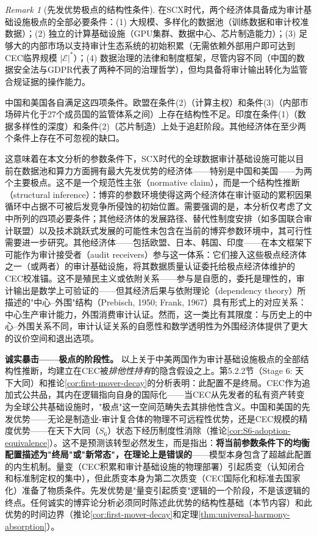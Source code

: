 \documentclass[12pt,a4paper]{ctexart}
\theoremstyle{definition}
\theoremstyle{remark}
\newtheorem{remark}{Remark}[section]
\begin{document}
\begin{remark}[先发优势极点的结构性条件]
在SCX时代，两个经济体具备成为审计基础设施极点的全部必要条件：(1) 大规模、多样化的数据池（训练数据和审计校准数据）；(2) 独立的计算基础设施（GPU集群、数据中心、芯片制造能力）；(3) 足够大的内部市场以支持审计生态系统的初始积累（无需依赖外部用户即可达到CEC临界规模 $|\mathcal{E}|^*$）；(4) 数据治理的法律和制度框架，尽管内容不同（中国的数据安全法与GDPR代表了两种不同的治理哲学），但均具备将审计输出转化为监管合规证据的操作能力。

中国和美国各自满足这四项条件。欧盟在条件(2)（计算主权）和条件(3)（内部市场碎片化于27个成员国的监管体系之间）上存在结构性不足。印度在条件(1)（数据多样性的深度）和条件(2)（芯片制造）上处于追赶阶段。其他经济体在至少两个条件上存在不可忽视的缺口。

这意味着在本文分析的参数条件下，SCX时代的全球数据审计基础设施可能以目前在数据池和算力方面拥有最大先发优势的经济体——特别是中国和美国——为两个主要极点。这不是一个规范性主张（normative claim），而是一个结构性推断（structural inference）：博弈的参数环境使得这两个经济体在审计驱动的累积因果循环中占据不可被后发竞争所侵蚀的初始位置。需要强调的是，本分析仅考虑了文中所列的四项必要条件；其他经济体的发展路径、替代性制度安排（如多国联合审计联盟）以及技术跳跃式发展的可能性未包含在当前的博弈参数环境中，其可行性需要进一步研究。其他经济体——包括欧盟、日本、韩国、印度——在本文框架下可能作为审计接受者（audit receivers）参与这一体系：它们接入这些极点经济体之一（或两者）的审计基础设施，将其数据质量认证委托给极点经济体维护的CEC校准锚。这不是殖民主义或依附关系——参与是自愿的，委托是理性的，审计输出是数学上可验证的——但其经济后果与依附理论（dependency theory）所描述的"中心–外围"结构（Prebisch, 1950; Frank, 1967）具有形式上的对应关系：中心生产审计能力，外围消费审计认证。然而，这一类比有其限度：与历史上的中心–外围关系不同，审计认证关系的自愿性和数学透明性为外围经济体提供了更大的议价空间和退出选项。

\textbf{诚实暴击——极点的阶段性。} 以上关于中美两国作为审计基础设施极点的全部结构性推断，均建立在CEC被\textit{排他性持有}的隐含假设之上。第5.2.2节（Stage 6: 天下大同）和推论\ref{cor:first-mover-decay}的分析表明：此配置不是终局。CEC作为追加式公共品，其内在逻辑指向自身的国际化——当CEC从先发者的私有资产转变为全球公共基础设施时，"极点"这一空间范畴失去其排他性含义。中国和美国的先发优势——无论是制造业-审计复合体的物理不可远程性优势，还是CEC规模的精度优势——在天下大同（$S_6$）状态下经历制度性消除（推论\ref{cor:S6-adoption-equivalence}）。这不是预测该转型必然发生，而是指出：\textbf{将当前参数条件下的均衡配置描述为"终局"或"新常态"，在理论上是错误的}——模型本身包含了超越此配置的内生机制。量变（CEC积累和审计基础设施的物理部署）引起质变（认知闭合和标准制定权的集中），但此质变本身为第二次质变（CEC国际化和标准去国家化）准备了物质条件。先发优势是"量变引起质变"逻辑的一个阶段，不是该逻辑的终点。任何诚实的博弈论分析必须同时陈述此优势的结构性基础（本节内容）和此优势的时间边界（推论\ref{cor:first-mover-decay}和定理\ref{thm:universal-harmony-absorption}）。
\end{remark}
\end{document}
